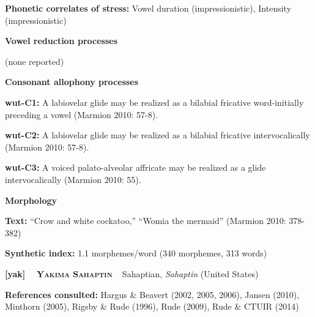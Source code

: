 \begin{styleBody}
\textbf{Phonetic correlates of stress: }Vowel duration (impressionistic), Intensity (impressionistic)
\end{styleBody}

\begin{styleBody}
\textbf{Vowel reduction processes}
\end{styleBody}

\begin{styleBody}
(none reported)
\end{styleBody}

\begin{styleBody}
\textbf{Consonant allophony processes}
\end{styleBody}

\begin{styleBody}
\textbf{wut-C1: }A labiovelar glide may be realized as a bilabial fricative word-initially preceding a vowel (Marmion 2010: 57-8).
\end{styleBody}

\begin{styleBody}
\textbf{wut-C2: }A labiovelar glide may be realized as a bilabial fricative intervocalically (Marmion 2010: 57-8).
\end{styleBody}

\begin{styleBody}
\textbf{wut-C3: }A voiced palato-alveolar affricate may be realized as a glide intervocalically (Marmion 2010: 55).
\end{styleBody}

\begin{styleBody}
\textbf{Morphology}
\end{styleBody}

\begin{styleBody}
\textbf{Text:} “Crow and white cockatoo,” “Womia the mermaid” (Marmion 2010: 378-382)
\end{styleBody}

\begin{styleBody}
\textbf{Synthetic index: }1.1 morphemes/word (340 morphemes, 313 words)
\end{styleBody}

\clearpage\begin{styleBody}
\textbf{[yak] }\ \ \textbf{\textsc{Yakima Sahaptin}}\textbf{\ \ }Sahaptian, \textit{Sahaptin} (United States)
\end{styleBody}

\begin{styleBody}
\textbf{References consulted: }Hargus \& Beavert (2002, 2005, 2006), Jansen (2010), Minthorn (2005), Rigsby \& Rude (1996), Rude (2009), Rude \& CTUIR (2014)
\end{styleBody}

